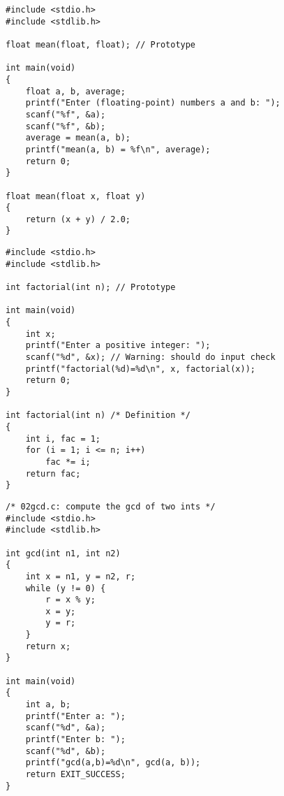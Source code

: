 \documentclass[a4paper, 10pt]{article}
\begin{document}
\begin{lstlisting}[style=cStyle, caption={Calculate Mean},basicstyle=\ttfamily\scriptsize]
#include <stdio.h>
#include <stdlib.h>

float mean(float, float); // Prototype

int main(void)
{
    float a, b, average;
    printf("Enter (floating-point) numbers a and b: ");
    scanf("%f", &a);
    scanf("%f", &b);
    average = mean(a, b);
    printf("mean(a, b) = %f\n", average);
    return 0;
}

float mean(float x, float y)
{
    return (x + y) / 2.0;
}
\end{lstlisting}

\begin{lstlisting}[style=cStyle, caption={Factorial of positive int}, basicstyle=\ttfamily\scriptsize]
#include <stdio.h>
#include <stdlib.h>

int factorial(int n); // Prototype

int main(void)
{
    int x;
    printf("Enter a positive integer: ");
    scanf("%d", &x); // Warning: should do input check
    printf("factorial(%d)=%d\n", x, factorial(x));
    return 0;
}

int factorial(int n) /* Definition */
{
    int i, fac = 1;
    for (i = 1; i <= n; i++)
        fac *= i;
    return fac;
}
\end{lstlisting}

\begin{lstlisting}[style=cStyle, caption={Greatest Common Divisor}, basicstyle=\ttfamily\scriptsize]
/* 02gcd.c: compute the gcd of two ints */
#include <stdio.h>
#include <stdlib.h>

int gcd(int n1, int n2)
{
    int x = n1, y = n2, r;
    while (y != 0) {
        r = x % y;
        x = y;
        y = r;
    }
    return x;
}

int main(void)
{
    int a, b;
    printf("Enter a: ");
    scanf("%d", &a);
    printf("Enter b: ");
    scanf("%d", &b);
    printf("gcd(a,b)=%d\n", gcd(a, b));
    return EXIT_SUCCESS;
}
\end{lstlisting}
\end{document}
